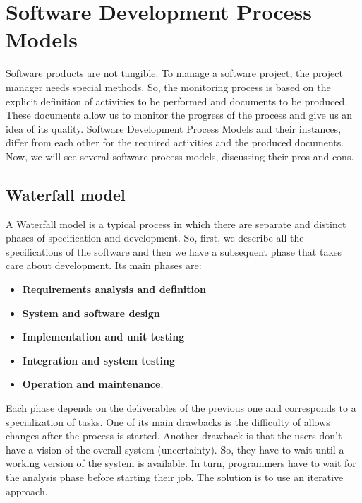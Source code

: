 \section{Software Development Process Models}
Software products are not tangible.
To manage a software project, the project manager needs special methods.
So, the monitoring process is based on the explicit definition of activities to be performed and documents to be produced.
These documents allow us to monitor the progress of the process and give us an idea of its quality.
Software Development Process Models and their instances, differ from each other for the required activities and the produced documents.
Now, we will see several software process models, discussing their pros and cons.

\subsection{Waterfall model}
A Waterfall model is a typical process in which there are separate and distinct phases of specification and development.
So, first, we describe all the specifications of the software and then we have a subsequent phase that takes care about development.
Its main phases are:
\begin{itemize}
    \item \textbf{Requirements analysis and definition}
    \item \textbf{System and software design}
    \item \textbf{Implementation and unit testing}
    \item \textbf{Integration and system testing}
    \item \textbf{Operation and maintenance}.
\end{itemize}
Each phase depends on the deliverables of the previous one and corresponds to a specialization of tasks.
One of its main drawbacks is the difficulty of allows changes after the process is started.
Another drawback is that the users don't have a vision of the overall system (uncertainty).
So, they have to wait until a working version of the system is available.
In turn, programmers have to wait for the analysis phase before starting their job.
The solution is to use an iterative approach.

